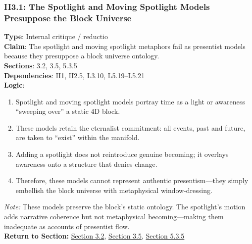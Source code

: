 \documentclass[12pt]{book}
\begin{document}
\subsubsection*{II3.1: The Spotlight and Moving Spotlight Models Presuppose the Block Universe}
\label{appendix:II3.1}
\textbf{Type}: Internal critique / reductio\\
\textbf{Claim}: The spotlight and moving spotlight metaphors fail as presentist models because they presuppose a block universe ontology.\\
\textbf{Sections}: 3.2, 3.5, 5.3.5\\
\textbf{Dependencies}: II1, II2.5, L3.10, L5.19–L5.21\\
\textbf{Logic}:
\begin{enumerate}
    \item Spotlight and moving spotlight models portray time as a light or awareness ``sweeping over'' a static 4D block.
    \item These models retain the eternalist commitment: all events, past and future, are taken to ``exist'' within the manifold.
    \item Adding a spotlight does not reintroduce genuine becoming; it overlays awareness onto a structure that denies change.
    \item Therefore, these models cannot represent authentic presentism---they simply embellish the block universe with metaphysical window-dressing.
\end{enumerate}
\textit{Note:} These models preserve the block's static ontology. The spotlight's motion adds narrative coherence but not metaphysical becoming---making them inadequate as accounts of presentist flow.\\
\textbf{Return to Section:} \hyperref[sec:3.2]{Section 3.2}, \hyperref[sec:3.5]{Section 3.5}, \hyperref[sec:5.3.5]{Section 5.3.5}
\end{document}
